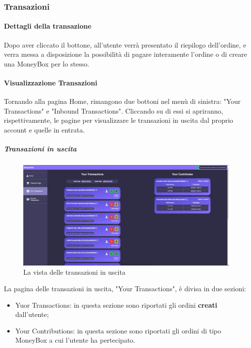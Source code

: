         \subsubsection{Transazioni}


            \paragraph{Dettagli della transazione}

            Dopo aver cliccato il bottone, all'utente verrà presentato il riepilogo dell'ordine, e verra messa a disposizione la possibilità
            di pagare interamente l'ordine o di creare una MoneyBox per lo stesso.


            \paragraph{Visualizzazione Transazioni}

            Tornando alla pagina Home, rimangono due bottoni nel menù di sinistra: "Your Transactions" e "Inbound Transactions".
            Cliccando su di essi si apriranno, rispettivamente, le pagine per visualizzare le transazioni in uscita dal proprio account e quelle in entrata.


                \subparagraph{Transazioni in uscita}

                \begin{figure}[H]
                    \centering
                    \includegraphics[scale=0.4]{immagini/transactionview.jpg}
                    \caption{La vista delle transazioni in uscita}
                \end{figure}

                La pagina delle transazioni in uscita, "Your Transactions", è divisa in due sezioni:
                \begin{itemize}
                    \item Yuor Transactions: in questa sezione sono riportati gli ordini \textbf{creati} dall'utente;
                    \item Your Contributions: in questa sezione sono riportati gli ordini di tipo MoneyBox a cui l'utente ha pertecipato.
                \end{itemize}


